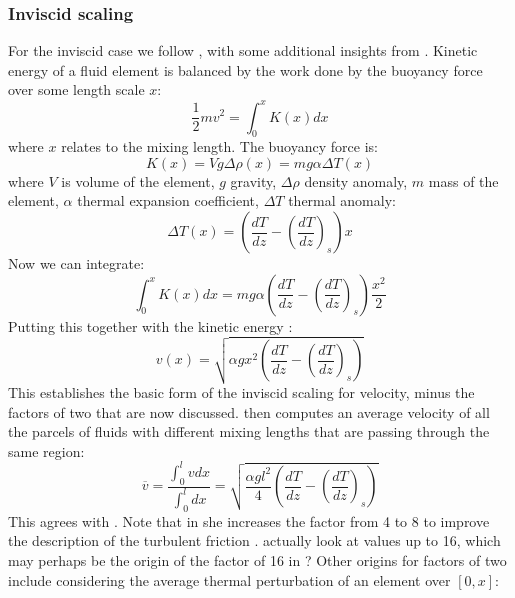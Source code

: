 \subsubsection{Inviscid scaling}
For the inviscid case we follow \citep{V53}, with some additional insights from \cite[p. 50,][]{KWW12}.  Kinetic energy of a fluid element is balanced by the work done by the buoyancy force over some length scale $x$:
\begin{equation}
\frac{1}{2} m v^2 = \int_0^x K(x) dx
\end{equation}
where $x$ relates to the mixing length.  The buoyancy force is:
\begin{equation}
K(x) = V g \Delta \rho(x) = m g \alpha \Delta T(x)
\end{equation}
where $V$ is volume of the element, $g$ gravity, $\Delta \rho$ density anomaly, $m$ mass of the element, $\alpha$ thermal expansion coefficient, $\Delta T$ thermal anomaly:
\begin{equation}
\Delta T(x) = \left( \frac{dT}{dz} - \left( \frac{dT}{dz} \right)_s \right) x
\end{equation}
Now we can integrate:
\begin{equation}
\int_0^x K(x) dx = mg \alpha  \left( \frac{dT}{dz} - \left( \frac{dT}{dz} \right)_s \right) \frac{x^2}{2}
\end{equation}
Putting this together with the kinetic energy \citep[Eq.~5,][]{V53}:
\begin{equation}
v(x) = \sqrt{\alpha g x^2 \left( \frac{dT}{dz} - \left( \frac{dT}{dz} \right)_s \right)}
\label{eq:mixvele}
\end{equation}
This establishes the basic form of the inviscid scaling for velocity, minus the factors of two that are now discussed.  \cite{V53} then computes an average velocity of all the parcels of fluids with different mixing lengths that are passing through the same region:
\begin{equation}
\overline{v} = \frac{\int_0^l v dx}{\int_0^l dx} = \sqrt{\frac{\alpha g l^2}{4} \left( \frac{dT}{dz} - \left( \frac{dT}{dz} \right)_s \right)}
\end{equation}
This agrees with \cite[Eq.~6a,][]{V53}.  Note that in \cite{V58} she increases the factor from 4 to 8 to improve the description of the turbulent friction \citep[see][]{B98}.  \cite{HVB65} actually look at values up to 16, which may perhaps be the origin of the factor of 16 in \cite{ABE93,ABE95}?  Other origins for factors of two include considering the average thermal perturbation of an element over $[0,x]$:
